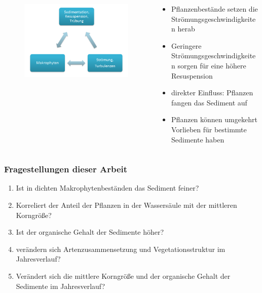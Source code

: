 \documentclass{beamer}
\begin{document}
\begin{frame}
\begin{columns}
\begin{column}{7cm}
\begin{figure}
\includegraphics[scale=0.28]{images/Schema_Pfl_Sedim_Strm}
\end{figure}
\end{column}
\begin{column}{5.8cm}
\hspace*{-12mm}
\begin{itemize}
\pause
\item Pflanzenbestände setzen die Strömungsgeschwindigkeiten herab
\pause
\item Geringere Strömungsgeschwindigkeiten sorgen für  eine höhere Resuspension 
\pause
\item direkter Einfluss: Pflanzen fangen das Sediment auf
\pause
\item[\alert<+>{\usebeamertemplate{itemize item}}] Pflanzen können umgekehrt Vorlieben für bestimmte Sedimente haben
\end{itemize}
\end{column}
\end{columns}
\end{frame}

\begin{frame}
\frametitle{Fragestellungen dieser Arbeit}
\begin{enumerate}
\pause
\item Ist in dichten Makrophytenbeständen das Sediment feiner?
\pause
\item Korreliert der Anteil der Pflanzen in der Wassersäule mit der mittleren Korngröße?
\pause
\item Ist der organische Gehalt der Sedimente höher?
\pause
\item verändern sich Artenzusammensetzung und Vegetationsstruktur im Jahresverlauf?
\pause
\item Verändert sich die mittlere Korngröße und der organische Gehalt der Sedimente im Jahresverlauf? 
\end{enumerate}
\end{frame}
\end{document}

